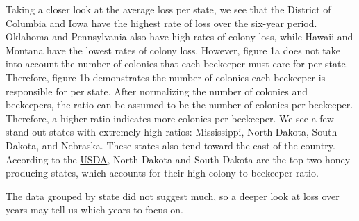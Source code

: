 \documentclass[11pt]{article}
\begin{document}
    Taking a closer look at the average loss per state, we see that the
District of Columbia and Iowa have the highest rate of loss over the
six-year period. Oklahoma and Pennsylvania also have high rates of
colony loss, while Hawaii and Montana have the lowest rates of colony
loss. However, figure 1a does not take into account the number of
colonies that each beekeeper must care for per state. Therefore, figure
1b demonstrates the number of colonies each beekeeper is responsible for
per state. After normalizing the number of colonies and beekeepers, the
ratio can be assumed to be the number of colonies per beekeeper.
Therefore, a higher ratio indicates more colonies per beekeeper. We see
a few stand out states with extremely high ratios: Mississippi, North
Dakota, South Dakota, and Nebraska. These states also tend toward the
east of the country. According to the
\href{https://www.nass.usda.gov/Surveys/Guide_to_NASS_Surveys/Bee_and_Honey/}{USDA},
North Dakota and South Dakota are the top two honey-producing states,
which accounts for their high colony to beekeeper ratio.

The data grouped by state did not suggest much, so a deeper look at loss
over years may tell us which years to focus on.
\end{document}
